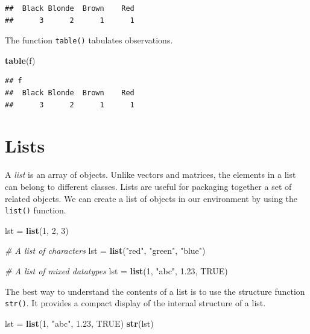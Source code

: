 \documentclass[
]{book}
\newenvironment{Shaded}{\begin{snugshade}}{\end{snugshade}}
\newcommand{\CommentTok}[1]{\textcolor[rgb]{0.56,0.35,0.01}{\textit{#1}}}
\newcommand{\DecValTok}[1]{\textcolor[rgb]{0.00,0.00,0.81}{#1}}
\newcommand{\FloatTok}[1]{\textcolor[rgb]{0.00,0.00,0.81}{#1}}
\newcommand{\KeywordTok}[1]{\textcolor[rgb]{0.13,0.29,0.53}{\textbf{#1}}}
\newcommand{\NormalTok}[1]{#1}
\newcommand{\OtherTok}[1]{\textcolor[rgb]{0.56,0.35,0.01}{#1}}
\newcommand{\StringTok}[1]{\textcolor[rgb]{0.31,0.60,0.02}{#1}}
\begin{document}
\begin{verbatim}
##  Black Blonde  Brown    Red 
##      3      2      1      1
\end{verbatim}

The function \texttt{table()} tabulates observations.

\begin{Shaded}
\begin{Highlighting}[]
\KeywordTok{table}\NormalTok{(f)}
\end{Highlighting}
\end{Shaded}

\begin{verbatim}
## f
##  Black Blonde  Brown    Red 
##      3      2      1      1
\end{verbatim}

\hypertarget{lists-1}{%
\section{Lists}\label{lists-1}}

A \emph{list} is an array of objects. Unlike vectors and matrices, the elements in a list can belong to different classes. Lists are useful for packaging together a set of related objects. We can create a list of objects in our environment by using the \texttt{list()} function.

\begin{Shaded}
\begin{Highlighting}[]
\NormalTok{lst =}\StringTok{ }\KeywordTok{list}\NormalTok{(}\DecValTok{1}\NormalTok{, }\DecValTok{2}\NormalTok{, }\DecValTok{3}\NormalTok{)}

\CommentTok{# A list of characters}
\NormalTok{lst =}\StringTok{ }\KeywordTok{list}\NormalTok{(}\StringTok{"red"}\NormalTok{, }\StringTok{"green"}\NormalTok{, }\StringTok{"blue"}\NormalTok{)}

\CommentTok{# A list of mixed datatypes}
\NormalTok{lst =}\StringTok{ }\KeywordTok{list}\NormalTok{(}\DecValTok{1}\NormalTok{, }\StringTok{"abc"}\NormalTok{, }\FloatTok{1.23}\NormalTok{, }\OtherTok{TRUE}\NormalTok{)}
\end{Highlighting}
\end{Shaded}

The best way to understand the contents of a list is to use the structure function \texttt{str()}. It provides a compact display of the internal structure of a list.

\begin{Shaded}
\begin{Highlighting}[]
\NormalTok{lst =}\StringTok{ }\KeywordTok{list}\NormalTok{(}\DecValTok{1}\NormalTok{, }\StringTok{"abc"}\NormalTok{, }\FloatTok{1.23}\NormalTok{, }\OtherTok{TRUE}\NormalTok{)}
\KeywordTok{str}\NormalTok{(lst)}
\end{Highlighting}
\end{Shaded}
\end{document}
